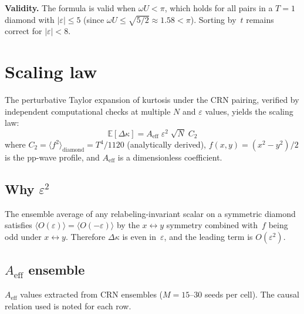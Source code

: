 \documentclass[11pt,a4paper]{article}
\begin{document}
\medskip\noindent
\textbf{Validity.}\;
The formula is valid when $\omega U < \pi$, which holds for all pairs in a $T = 1$ diamond
with $|\varepsilon| \le 5$ (since $\omega U \le \sqrt{5/2} \approx 1.58 < \pi$).  Sorting
by~$t$ remains correct for $|\varepsilon| < 8$.

\section{Scaling law}
\label{sec:scaling}

The perturbative Taylor expansion of kurtosis under the CRN pairing, verified by independent
computational checks at multiple $N$ and $\varepsilon$ values, yields the scaling law:
\begin{equation}
  \boxed{\;\mathbb{E}[\Delta\kappa]
  = A_{\mathrm{eff}}\;\varepsilon^{2}\;\sqrt{N}\;C_{2}\;}
  \label{eq:scaling}
\end{equation}
where $C_{2} = \langle f^{2}\rangle_{\mathrm{diamond}} = T^{4}/1120$ (analytically derived),
$f(x,y) = (x^{2} - y^{2})/2$ is the pp-wave profile, and $A_{\mathrm{eff}}$ is a
dimensionless coefficient.

\subsection{Why \texorpdfstring{$\varepsilon^{2}$}{epsilon squared}}
\label{ssec:eps2}

The ensemble average of any relabeling-invariant scalar on a symmetric diamond
satisfies
$\langle O(\varepsilon)\rangle = \langle O(-\varepsilon)\rangle$
by the $x\!\leftrightarrow\!y$ symmetry combined with~$f$ being odd under
$x\!\leftrightarrow\!y$.  Therefore $\Delta\kappa$ is even in~$\varepsilon$,
and the leading term is $O(\varepsilon^{2})$.

\subsection{\texorpdfstring{$A_{\mathrm{eff}}$}{Aeff} ensemble}
\label{ssec:aeff}

$A_{\mathrm{eff}}$ values extracted from CRN ensembles ($M = 15$--$30$ seeds per cell).
The causal relation used is noted for each row.
\end{document}
